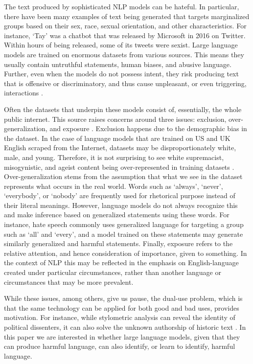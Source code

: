\documentclass{bmcart}
\begin{document}
The text produced by sophisticated NLP models can be hateful. In particular, there have been many examples of text being generated that targets marginalized groups based on their sex, race, sexual orientation, and other characteristics. For instance, `Tay' was a chatbot that was released by Microsoft in 2016 on Twitter. Within hours of being released, some of its tweets were sexist. Large language models are trained on enormous datasets from various sources. This means they usually contain untruthful statements, human biases, and abusive language. Further, even when the models do not possess intent, they risk producing text that is offensive or discriminatory, and thus cause unpleasant, or even triggering, interactions \cite{bender2021dangers}.

Often the datasets that underpin these models consist of, essentially, the whole public internet. This source raises concerns around three issues: exclusion, over-generalization, and exposure \cite{hovy2016social}. Exclusion happens due to the demographic bias in the dataset. In the case of language models that are trained on US and UK English scraped from the Internet, datasets may be disproportionately white, male, and young. Therefore, it is not surprising to see white supremacist, misogynistic, and ageist content being over-represented in training datasets \cite{bender2021dangers}. Over-generalization stems from the assumption that what we see in the dataset represents what occurs in the real world. Words such as `always', `never', `everybody', or `nobody' are frequently used for rhetorical purpose instead of their literal meanings. However, language models do not always recognize this and make inference based on generalized statements using these words. For instance, hate speech commonly uses generalized language for targeting a group such as `all' and `every', and a model trained on these statements may generate similarly generalized and harmful statements. Finally, exposure refers to the relative attention, and hence consideration of importance, given to something. In the context of NLP this may be reflected in the emphasis on English-language created under particular circumstances, rather than another language or circumstances that may be more prevalent.

While these issues, among others, give us pause, the dual-use problem, which is that the same technology can be applied for both good and bad uses, provides motivation. For instance, while stylometric analysis can reveal the identity of political dissenters, it can also solve the unknown authorship of historic text \cite{hovy2016social}. In this paper we are interested in whether large language models, given that they can produce harmful language, can also identify, or learn to identify, harmful language.
\end{document}

